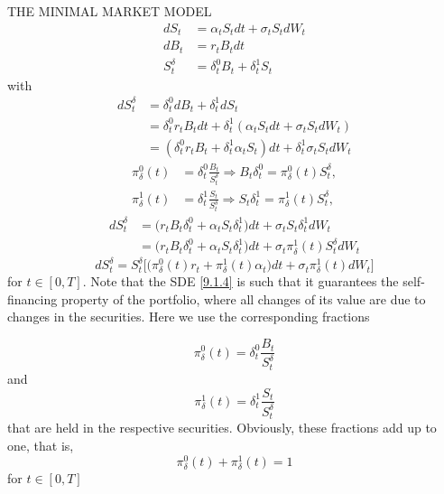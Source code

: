 \documentclass[unknownkeysallowed, compress]{beamer}
\theoremstyle{plain}
\begin{document}
\begin{frame}[allowframebreaks]{THE MINIMAL MARKET MODEL}
\begin{align*}
    dS_t& = \alpha_tS_tdt+\sigma_tS_tdW_t\\
    dB_t& = r_tB_tdt\\
    S_t^\delta & = \delta_t^0B_t+\delta_t^1S_t
\end{align*}
with
\begin{align*}
    dS_t^\delta& = \delta_t^0dB_t+\delta_t^1dS_t\\
    & = \delta_t^0r_tB_tdt+\delta_t^1(\alpha_tS_tdt+\sigma_tS_tdW_t)\\
    & = (\delta_t^0r_tB_t+\delta_t^1\alpha_tS_t)dt+\delta_t^1\sigma_tS_tdW_t
\end{align*}
\begin{align*}
    \pi_\delta^0(t)& = \delta_t^0\frac{B_t}{S_t^\delta}\Longrightarrow B_t\delta_t^0 = \pi^0_\delta(t) S_t^\delta,\\
    \pi_\delta^1(t)& = \delta_t^1\frac{S_t}{S_t^\delta}\Longrightarrow S_t\delta_t^1 = \pi^1_\delta(t) S_t^\delta,
\end{align*}
\begin{align*}
dS_t^\delta & = \bigg(r_t B_t\delta_t^0+\alpha_tS_t\delta_t^1\bigg)dt+\sigma_tS_t\delta_t^1dW_t\\
& = \bigg(r_t B_t\delta_t^0+\alpha_tS_t\delta_t^1\bigg)dt+\sigma_t\pi^1_\delta(t)S_t^\delta dW_t
\end{align*}
\begin{equation}\label{9.1.4}
dS_t^\delta = S_t^\delta\bigg[\bigg(\pi_\delta^0(t)r_t+\pi_\delta^1(t)\alpha_t\bigg)dt+\sigma_t\pi_\delta^1(t)dW_t\bigg]
\end{equation}
for $t\in[0,T]$. Note that the SDE \eqref{9.1.4} is such that it guarantees the self-financing property of the portfolio, where all changes of its value are due to changes in the securities. Here we use the corresponding fractions

\begin{equation}\label{9.1.5}
\pi_\delta^0(t) = \delta_t^0\frac{B_t}{S_t^\delta}
\end{equation}
and 
\begin{equation}\label{9.1.6}
\pi_\delta^1(t) = \delta_t^1\frac{S_t}{S_t^\delta}
\end{equation}
that are held in the respective securities. Obviously, these fractions add up to one, that is,
\begin{equation}\label{9.1.7}
\pi_\delta^0(t)+\pi_\delta^1(t) = 1
\end{equation}
for $t\in[0,T]$\\


\end{frame}
\end{document}
